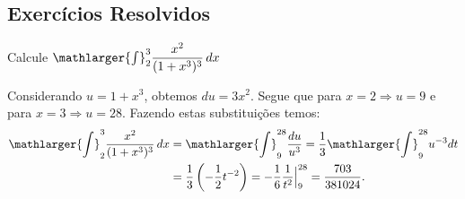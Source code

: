 \cleardoublepage\documentclass[../main.tex]{subfiles}
\begin{document}
\subsection{Exercícios Resolvidos}

\begin{exeresol}
  Calcule \(\mathlarger{\int}^{3}_{2} \dfrac{x^2}{(1+x^3)^3}\,dx\)\\
  
  \begin{solution}
  Considerando \(u=1+x^3\), obtemos \(du=3x^2\). Segue que para $x=2\Rightarrow u=9$ e para $x=3\Rightarrow u=28$. Fazendo estas substituições temos:
  \begin{align*}
      \mathlarger{\int}^{3}_{2} \dfrac{x^2}{(1+x^3)^3}\,dx &= \mathlarger{\int}^{28}_{9} \dfrac{du}{u^3}= \dfrac{1}{3} \mathlarger{\int}^{28}_{9} u^{-3}dt\\
      &=\dfrac{1}{3}\left(-\dfrac{1}{2}t^{-2}\right)=-\dfrac{1}{6}\dfrac{1}{t^2}\Big{|}^{28}_{9} = \dfrac{703}{381024}.
  \end{align*}


  \end{solution}
  \end{exeresol}
\end{document}
